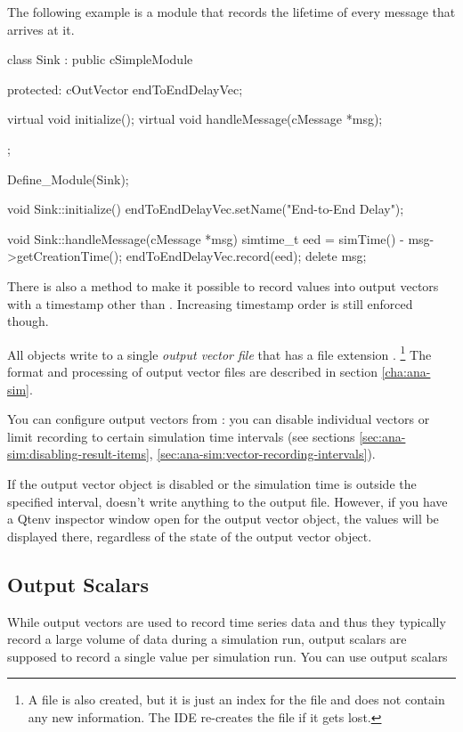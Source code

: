 The following example is a  module that records the lifetime
of every message that arrives at it.

\begin{cpp}
class Sink : public cSimpleModule
{
  protected:
    cOutVector endToEndDelayVec;

    virtual void initialize();
    virtual void handleMessage(cMessage *msg);
};

Define_Module(Sink);

void Sink::initialize()
{
    endToEndDelayVec.setName("End-to-End Delay");
}

void Sink::handleMessage(cMessage *msg)
{
    simtime_t eed = simTime() - msg->getCreationTime();
    endToEndDelayVec.record(eed);
    delete msg;
}
\end{cpp}

There is also a  method to make it
possible to record values into output vectors with a timestamp other than
. Increasing timestamp order is still enforced though.

All  objects write to a single \textit{output vector file}
that has a file extension .
  \footnote{A  file is also created, but it is just an index for
  the  file and does not contain any new information. The IDE
  re-creates the  file if it gets lost.}
The format and processing of output vector files are described in section
\ref{cha:ana-sim}.

You can configure output vectors from :
you can disable individual vectors or limit recording to certain
simulation time intervals (see sections
\ref{sec:ana-sim:disabling-result-items},
\ref{sec:ana-sim:vector-recording-intervals}).

If the output vector object is disabled or the simulation time is
outside the specified interval,  doesn't write
anything to the output file. However, if you have a Qtenv inspector
window open for the output vector object,
the values will be displayed there, regardless of the state of the
output vector object.



\subsection{Output Scalars}
\label{sec:sim-lib:output-scalars}

While output vectors are used to record time series data and thus they
typically record a large volume of data during a simulation run,
output scalars are supposed to record a single
value per simulation run. You can use output scalars

